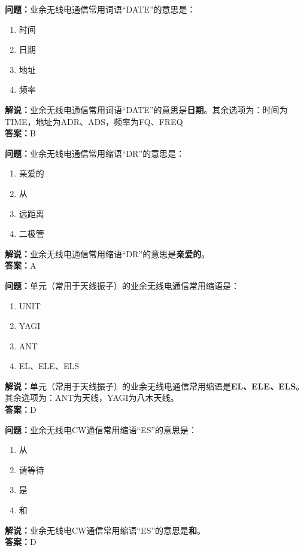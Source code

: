 \bigskip


\noindent\textbf{问题：}业余无线电通信常用词语“DATE”的意思是：
\begin{enumerate}[label=\Alph*), leftmargin=3em]
\item 时间
\item 日期
\item 地址
\item 频率
\end{enumerate}
\noindent\textbf{解说：}业余无线电通信常用词语“DATE”的意思是\textbf{日期}。其余选项为：时间为TIME，地址为ADR、ADS，频率为FQ、FREQ\\\noindent\textbf{答案：}B

\bigskip


\noindent\textbf{问题：}业余无线电通信常用缩语“DR”的意思是：
\begin{enumerate}[label=\Alph*), leftmargin=3em]
\item 亲爱的
\item 从
\item 远距离
\item 二极管
\end{enumerate}
\noindent\textbf{解说：}业余无线电通信常用缩语“DR”的意思是\textbf{亲爱的}。\\\noindent\textbf{答案：}A

\bigskip


\noindent\textbf{问题：}单元（常用于天线振子）的业余无线电通信常用缩语是：
\begin{enumerate}[label=\Alph*), leftmargin=3em]
\item UNIT
\item YAGI
\item ANT
\item EL、ELE、ELS
\end{enumerate}
\noindent\textbf{解说：}单元（常用于天线振子）的业余无线电通信常用缩语是\textbf{EL、ELE、ELS}。其余选项为：ANT为天线，YAGI为八木天线。\\\noindent\textbf{答案：}D

\bigskip


\noindent\textbf{问题：}业余无线电CW通信常用缩语“ES”的意思是：
\begin{enumerate}[label=\Alph*), leftmargin=3em]
\item 从
\item 请等待
\item 是
\item 和
\end{enumerate}
\noindent\textbf{解说：}业余无线电CW通信常用缩语“ES”的意思是\textbf{和}。\\\noindent\textbf{答案：}D

